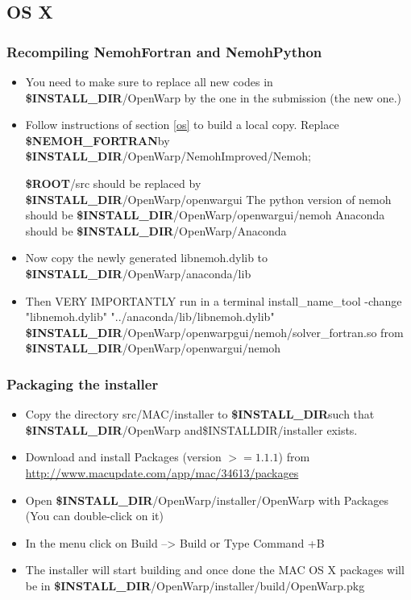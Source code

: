 \documentclass[12pt]{article}
\newcommand{\ROOT}{{\textbf{\$ROOT}}}
\newcommand{\NEMOHFORTRAN}{{\textbf{\$NEMOH{\_}FORTRAN}}}
\newcommand{\INSTALLDIR}{{\textbf{\$INSTALL{\_}DIR}}}
\begin{document}
\subsection{OS X}

\subsubsection{Recompiling NemohFortran and NemohPython}

\begin{itemize}
	
	 	\item You need to make sure to replace all new codes in \INSTALLDIR/OpenWarp by the one in the submission (the new one.)
	 	\item Follow instructions of section \ref*{os} to build a local copy.
	 	Replace \NEMOHFORTRAN by \INSTALLDIR/OpenWarp/NemohImproved/Nemoh;
	 	
	 	\ROOT/src should be replaced by \INSTALLDIR/OpenWarp/openwargui
	 	The python version of nemoh should be \INSTALLDIR/OpenWarp/openwargui/nemoh Anaconda should be \INSTALLDIR/OpenWarp/Anaconda
 \item Now copy the newly generated libnemoh.dylib to \INSTALLDIR/OpenWarp/anaconda/lib
\item Then {\color{red} VERY IMPORTANTLY} run in a terminal
 {\color{blue} install{\_}name{\_}tool -change "libnemoh.dylib" "../anaconda/lib/libnemoh.dylib" \INSTALLDIR/OpenWarp/openwarpgui/nemoh/solver{\_}fortran.so}  from \INSTALLDIR/OpenWarp/openwargui/nemoh
	
\end{itemize}

\subsubsection{Packaging the installer}

\begin{itemize}
	\item Copy the directory src/MAC/installer to \INSTALLDIR such that \INSTALLDIR/OpenWarp and\$INSTALLDIR/installer exists.
\item Download and install Packages (version $>= 1.1.1$) from \url{http://www.macupdate.com/app/mac/34613/packages}
\item Open \INSTALLDIR/OpenWarp/installer/OpenWarp with Packages (You can double-click on it)
\item In the menu click on Build --> Build or Type Command +B
\item The installer will start building and once done the MAC OS X packages will be in \INSTALLDIR/OpenWarp/installer/build/OpenWarp.pkg
\end{itemize}
\end{document}

